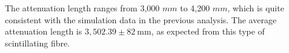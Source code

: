     The attenuation length ranges from 3,000 $mm$ to 4,200 $mm$, which is quite consistent with the simulation data in the previous analysis. The average attenuation length is $3,502.39 \pm 82\ \mathrm{mm}$, as expected from this type of scintillating fibre.
    
